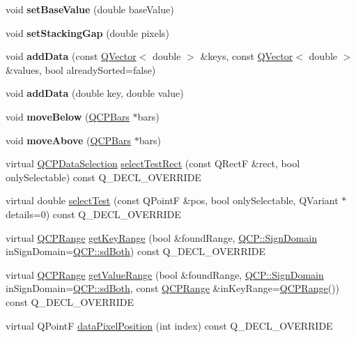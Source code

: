\begin{DoxyCompactItemize}
void {\bfseries set\+Base\+Value} (double base\+Value)
\item 
\mbox{\label{class_q_c_p_bars_aeacf7561afb1c70284b22822b57c7bb5}} 
void {\bfseries set\+Stacking\+Gap} (double pixels)
\item 
\mbox{\label{class_q_c_p_bars_a323d6970d6d6e3166d89916a7f60f733}} 
void {\bfseries add\+Data} (const \hyperlink{class_q_vector}{Q\+Vector}$<$ double $>$ \&keys, const \hyperlink{class_q_vector}{Q\+Vector}$<$ double $>$ \&values, bool already\+Sorted=false)
\item 
\mbox{\label{class_q_c_p_bars_a684dd105403a5497fda42f2094fecbb7}} 
void {\bfseries add\+Data} (double key, double value)
\item 
\mbox{\label{class_q_c_p_bars_a69fc371346980f19177c3d1ecdad78ee}} 
void {\bfseries move\+Below} (\hyperlink{class_q_c_p_bars}{Q\+C\+P\+Bars} $\ast$bars)
\item 
\mbox{\label{class_q_c_p_bars_ac22e00a6a41509538c21b04f0a57318c}} 
void {\bfseries move\+Above} (\hyperlink{class_q_c_p_bars}{Q\+C\+P\+Bars} $\ast$bars)
\item 
virtual \hyperlink{class_q_c_p_data_selection}{Q\+C\+P\+Data\+Selection} \hyperlink{class_q_c_p_bars_a429d8c3c39972bf6069329175bb85c34}{select\+Test\+Rect} (const Q\+RectF \&rect, bool only\+Selectable) const Q\+\_\+\+D\+E\+C\+L\+\_\+\+O\+V\+E\+R\+R\+I\+DE
\item 
virtual double \hyperlink{class_q_c_p_bars_a7b282a2932c7c0b4a45bd61e8c490153}{select\+Test} (const Q\+PointF \&pos, bool only\+Selectable, Q\+Variant $\ast$details=0) const Q\+\_\+\+D\+E\+C\+L\+\_\+\+O\+V\+E\+R\+R\+I\+DE
\item 
virtual \hyperlink{class_q_c_p_range}{Q\+C\+P\+Range} \hyperlink{class_q_c_p_bars_a3cc3cefe0a486f6cf5793b0bdc7b58cc}{get\+Key\+Range} (bool \&found\+Range, \hyperlink{namespace_q_c_p_afd50e7cf431af385614987d8553ff8a9}{Q\+C\+P\+::\+Sign\+Domain} in\+Sign\+Domain=\hyperlink{namespace_q_c_p_afd50e7cf431af385614987d8553ff8a9a3dee7e9cd2fedce9253b83e172626a6c}{Q\+C\+P\+::sd\+Both}) const Q\+\_\+\+D\+E\+C\+L\+\_\+\+O\+V\+E\+R\+R\+I\+DE
\item 
virtual \hyperlink{class_q_c_p_range}{Q\+C\+P\+Range} \hyperlink{class_q_c_p_bars_a778d219e4d8939b3e794cbad8e373f20}{get\+Value\+Range} (bool \&found\+Range, \hyperlink{namespace_q_c_p_afd50e7cf431af385614987d8553ff8a9}{Q\+C\+P\+::\+Sign\+Domain} in\+Sign\+Domain=\hyperlink{namespace_q_c_p_afd50e7cf431af385614987d8553ff8a9a3dee7e9cd2fedce9253b83e172626a6c}{Q\+C\+P\+::sd\+Both}, const \hyperlink{class_q_c_p_range}{Q\+C\+P\+Range} \&in\+Key\+Range=\hyperlink{class_q_c_p_range}{Q\+C\+P\+Range}()) const Q\+\_\+\+D\+E\+C\+L\+\_\+\+O\+V\+E\+R\+R\+I\+DE
\item 
virtual Q\+PointF \hyperlink{class_q_c_p_bars_a71faeb70a3834f1f391c1a7e11c9fce7}{data\+Pixel\+Position} (int index) const Q\+\_\+\+D\+E\+C\+L\+\_\+\+O\+V\+E\+R\+R\+I\+DE
\end{DoxyCompactItemize}

